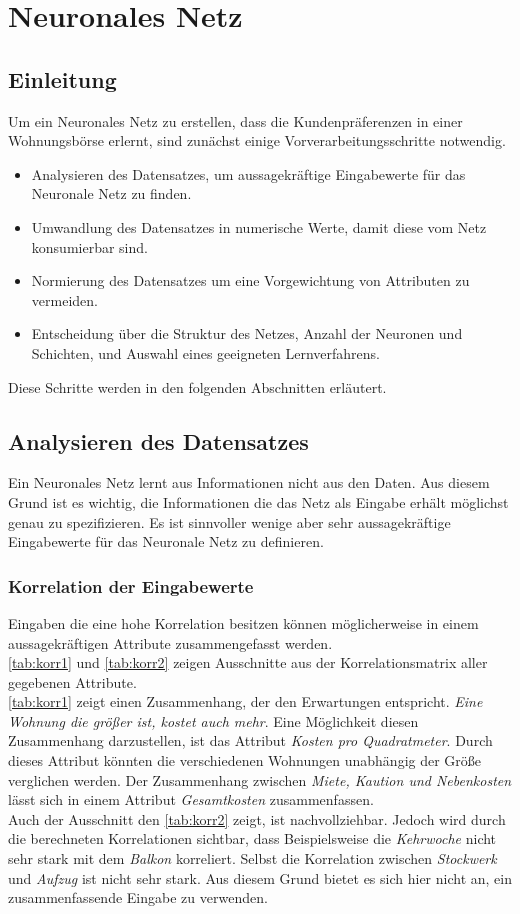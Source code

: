 \section{Neuronales Netz}\label{sec:nn}
\subsection{Einleitung}
Um ein Neuronales Netz zu erstellen, dass die Kundenpräferenzen in einer Wohnungsbörse erlernt,
sind zunächst einige Vorverarbeitungsschritte notwendig.
\begin{itemize}
    \item Analysieren des Datensatzes, um aussagekräftige Eingabewerte für das Neuronale Netz zu
            finden.
    \item Umwandlung des Datensatzes in numerische Werte, damit diese vom Netz konsumierbar sind.
    \item Normierung des Datensatzes um eine Vorgewichtung von Attributen zu vermeiden.
    \item Entscheidung über die Struktur des Netzes, Anzahl der Neuronen und Schichten, und Auswahl 
            eines geeigneten Lernverfahrens.
\end{itemize}
Diese Schritte werden in den folgenden Abschnitten erläutert. 

\subsection{Analysieren des Datensatzes}
Ein Neuronales Netz lernt aus Informationen nicht aus den Daten. Aus diesem Grund ist es wichtig, 
die Informationen die das Netz als Eingabe erhält möglichst genau zu spezifizieren. Es ist 
sinnvoller wenige aber sehr aussagekräftige Eingabewerte für das Neuronale Netz zu definieren.
\subsubsection{Korrelation der Eingabewerte} 
Eingaben die eine hohe Korrelation besitzen können möglicherweise in einem aussagekräftigen Attribute
zusammengefasst werden. \\
\autoref{tab:korr1} und \autoref{tab:korr2} zeigen Ausschnitte aus der Korrelationsmatrix aller 
gegebenen Attribute. \\
\autoref{tab:korr1} zeigt einen Zusammenhang, der den Erwartungen entspricht. \textit{Eine Wohnung die größer ist, kostet auch mehr}.
Eine Möglichkeit diesen Zusammenhang darzustellen, ist das Attribut \textit{Kosten pro Quadratmeter}. Durch dieses Attribut
könnten die verschiedenen Wohnungen unabhängig der Größe verglichen werden. Der Zusammenhang zwischen \textit{Miete, Kaution und Nebenkosten}
lässt sich in einem Attribut \textit{Gesamtkosten} zusammenfassen.\\
Auch der Ausschnitt den \autoref{tab:korr2} zeigt, ist nachvollziehbar. Jedoch wird durch die berechneten Korrelationen sichtbar, 
dass Beispielsweise die \textit{Kehrwoche} nicht sehr stark mit dem \textit{Balkon} korreliert. Selbst die Korrelation zwischen
\textit{Stockwerk} und \textit{Aufzug} ist nicht sehr stark. Aus diesem Grund bietet es sich hier nicht an, ein zusammenfassende 
Eingabe zu verwenden.

